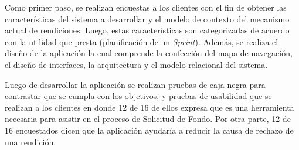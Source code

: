 \begin{resumen}

   
    Como primer paso, se realizan encuestas a los clientes con el fin de obtener las características del sistema a desarrollar y el modelo de contexto del mecanismo actual de rendiciones. Luego, estas características son categorizadas de acuerdo con la utilidad que presta (planificación de un \emph{Sprint}). Además, se realiza el diseño de la aplicación la cual comprende la confección del mapa de navegación, el diseño de interfaces, la arquitectura y el modelo relacional del sistema.

    

    Luego de desarrollar la aplicación se realizan pruebas de caja negra para contrastar que se cumpla con los objetivos, y pruebas de usabilidad que se realizan a los clientes en donde 12 de 16 de ellos expresa que es una herramienta necesaria para asistir en el proceso de Solicitud de Fondo. Por otra parte, 12 de 16 encuestados dicen que la aplicación ayudaría a reducir la causa de rechazo de una rendición.

    

\end{resumen}
